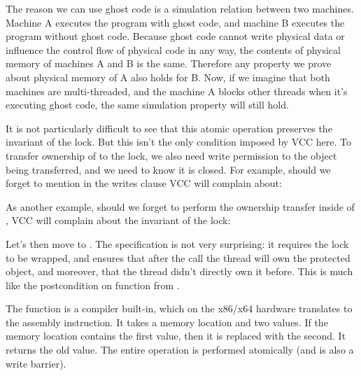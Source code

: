 \begin{note}
The reason we can use ghost code is a simulation relation between two machines.
Machine A executes the program with ghost code, and machine B executes the program
without ghost code.
Because ghost code cannot write physical data or influence the control flow of physical code
in any way, the contents of physical memory of machines A and B is the same.
Therefore any property we prove about physical memory of A also holds for B.
Now, if we imagine that both machines are multi-threaded, and the machine A blocks
other threads when it's executing ghost code, the same simulation property will still hold.
\end{note}

It is not particularly difficult to see that this atomic operation preserves the
invariant of the lock.
But this isn't the only condition imposed by VCC here.
To transfer ownership of  to the lock, we also need
write permission to the object being transferred, and
we need to know it is closed.
For example, should we forget to mention 
in the writes clause VCC will complain about:


\noindent
As another example, should we forget to perform the ownership transfer inside of , VCC will complain
about the invariant of the lock:


Let's then move to . 
The specification is not very surprising: it requires the lock to be wrapped,
and ensures that after the call the thread will own the protected object,
and moreover, that the thread didn't directly own it before.
This is much like the postcondition on  function
from .


\noindent
The  function is a compiler built-in,
which on the x86/x64 hardware translates to the  assembly instruction.
It takes a memory location and two values.
If the memory location contains the first value, then it is replaced with the second.
It returns the old value.
The entire operation is performed atomically (and is also a write barrier).

